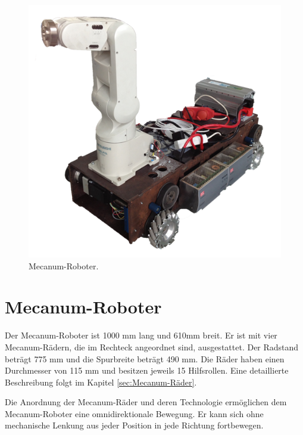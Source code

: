 \newpage
\begin{figure}[H]
\centering
 \includegraphics[width=.6\textwidth]{Abbildungen/Roboter} 
\caption[Mecanum-Roboter]{Mecanum-Roboter.}
\label{fig:Roboter}
\end{figure}

\section {Mecanum-Roboter}
\label{sec:Mecanum-Roboter}

Der Mecanum-Roboter ist 1000 mm lang und 610mm breit. Er ist mit vier Mecanum-Rädern, die im Rechteck angeordnet sind, ausgestattet. Der Radstand beträgt 775 mm und die Spurbreite beträgt 490 mm. Die Räder haben einen Durchmesser von 115 mm und besitzen jeweils 15 Hilfsrollen. Eine detaillierte Beschreibung folgt im Kapitel \ref{sec:Mecanum-Räder}.

Die Anordnung der Mecanum-Räder und deren Technologie ermöglichen dem Mecanum-Roboter eine omnidirektionale Bewegung. Er kann sich ohne mechanische Lenkung aus jeder Position in jede Richtung fortbewegen.

